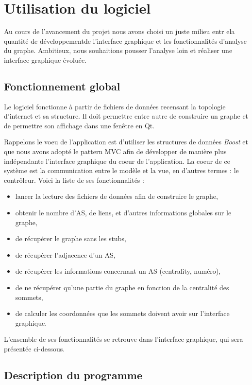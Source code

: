 \section{Utilisation du logiciel}

Au cours de l'avancement du projet nous avons choisi un juste milieu entr ela quantit\'e de d\'eveloppementde l'interface graphique et les fonctionnalit\'es d'analyse du graphe. Ambitieux, nous souhaitions pousser l'analyse loin et réaliser une interface graphique évoluée.

\subsection{Fonctionnement global}
Le logiciel fonctionne \`a partir de fichiers de données recensant la topologie d'internet et sa structure. Il doit permettre entre autre de construire un graphe et de permettre son affichage dans une fenêtre en Qt.

Rappelons le voeu de l'application est d'utiliser les structures de donn\'ees \textit{Boost} et que nous avons adopté le pattern MVC afin de développer de manière plus ind\'ependante l'interface graphique du coeur de l'application. La coeur de ce système est la communication entre le modèle et la vue, en d'autres termes : le contrôleur. Voici la liste de ses fonctionnalités :
\begin{itemize}
 \item lancer la lecture des fichiers de données afin de construire le graphe,
\item obtenir le nombre d'AS, de liens, et d'autres informations globales sur le graphe,
\item de récupérer le graphe sans les stubs,
\item de récupérer l'adjacence d'un AS,
\item de récupérer les informations concernant un AS (centrality, numéro),
\item de ne récupérer qu'une partie du graphe en fonction de la centralité des sommets,
\item de calculer les coordonnées que les sommets doivent avoir sur l'interface graphique.
\end{itemize}

L'ensemble de ses fonctionnalités se retrouve dans l'interface graphique, qui sera présentée ci-dessous.

\subsection{Description du programme}

